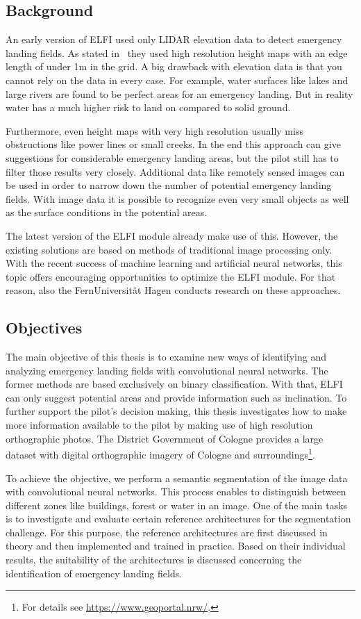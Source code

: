 \subsection{Background}
An early version of ELFI used only LIDAR elevation data to detect emergency landing fields. As stated in~\cite{feu_elfi} they used high resolution height maps with an edge length of under 1m in the grid. A big drawback with elevation data is that you cannot rely on the data in every case. For example, water surfaces like lakes and large rivers are found to be perfect areas for an emergency landing. But in reality water has a much higher risk to land on compared to solid ground.

Furthermore, even height maps with very high resolution usually miss obstructions like power lines or small creeks. In the end this approach can give suggestions for considerable emergency landing areas, but the pilot still has to filter those results very closely. Additional data like remotely sensed images can be used in order to narrow down the number of potential emergency landing fields. With image data it is possible to recognize even very small objects as well as the surface conditions in the potential areas.

The latest version of the ELFI module already make use of this. However, the existing solutions are based on methods of traditional image processing only. With the recent success of machine learning and artificial neural networks, this topic offers encouraging opportunities to optimize the ELFI module. For that reason, also the FernUniversität Hagen conducts research on these approaches.

\subsection{Objectives}
The main objective of this thesis is to examine new ways of identifying and analyzing emergency landing fields with convolutional neural networks. The former methods are based exclusively on binary classification. With that, ELFI can only suggest potential areas and provide information such as inclination. To further support the pilot's decision making, this thesis investigates how to make more information available to the pilot by making use of high resolution orthographic photos. The District Government of Cologne provides a large dataset with digital orthographic imagery of Cologne and surroundings\footnote{For details see \url{https://www.geoportal.nrw/}.}.

To achieve the objective, we perform a semantic segmentation of the image data with convolutional neural networks. This process enables to distinguish between different zones like buildings, forest or water in an image. One of the main tasks is to investigate and evaluate certain reference architectures for the segmentation challenge. For this purpose, the reference architectures are first discussed in theory and then implemented and trained in practice. Based on their individual results, the suitability of the architectures is discussed concerning the identification of emergency landing fields.

